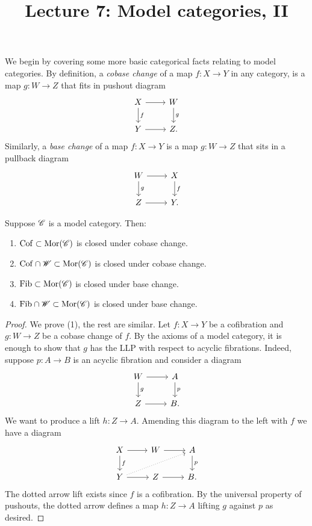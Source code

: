 \documentclass[11pt]{amsart}
\title{Lecture 7: Model categories, II}
\begin{document}
\maketitle

We begin by covering some more basic categorical facts relating to model categories. 
By definition, a {\em cobase change} of a map $f : X \to Y$ in any category, is a map $g : W \to Z$ that fits in pushout diagram
\[
\begin{tikzcd}
X \ar[d,"f"] \ar[r] & W \ar[d,"g"] \\
Y \ar[r] & Z .
\end{tikzcd}
\]
Similarly, a {\em base change} of a map $f : X \to Y$ is a map $g : W \to Z$ that sits in a pullback diagram
\[
\begin{tikzcd}
W \ar[d,"g"] \ar[r] & X \ar[d,"f"] \\
Z \ar[r] & Y .
\end{tikzcd}
\]

\begin{prop}
Suppose $\mathscr C$ is a model category.
Then:
\begin{enumerate}
\item ${\rm Cof} \subset {\rm Mor}(\mathscr C)$ is closed under cobase change.
\item ${\rm Cof} \cap \mathscr W \subset {\rm Mor}(\mathscr C) $ is closed under cobase change.
\item ${\rm Fib} \subset {\rm Mor}(\mathscr C)$ is closed under base change.
\item ${\rm Fib} \cap \mathscr W \subset {\rm Mor}(\mathscr C)$ is closed under base change. 
\end{enumerate}
\end{prop}
\begin{proof}
We prove (1), the rest are similar. 
Let $f : X \to Y$ be a cofibration and $g : W \to Z$ be a cobase change of $f$. 
By the axioms of a model category, it is enough to show that $g$ has the LLP with respect to acyclic fibrations. 
Indeed, suppose $p : A \to B$ is an acyclic fibration and consider a diagram
\[
\begin{tikzcd}
W \ar[d,"g"] \ar[r] & A \ar[d,"p"] \\
Z \ar[r] & B .
\end{tikzcd}
\]
We want to produce a lift $h : Z \to A$.
Amending this diagram to the left with $f$ we have a diagram
\[
\begin{tikzcd}
X \ar[r] \ar[d, "f"] & W \ar[r] & A \ar[d,"p"] \\
Y \ar[urr, dotted] \ar[r] &  Z \ar[r] & B .
\end{tikzcd}
\]
The dotted arrow lift exists since $f$ is a cofibration. 
By the universal property of pushouts, the dotted arrow defines a map $h : Z \to A$ lifting $g$ against $p$ as desired. 
\end{proof} 
\end{document}
